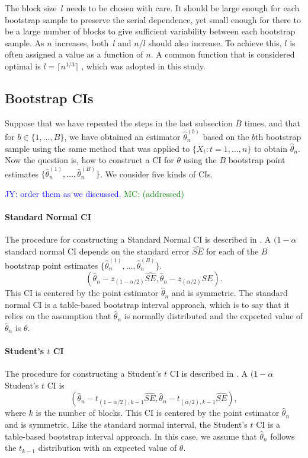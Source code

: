 \documentclass[12pt, letterpaper, titlepage]{article}
\newcommand{\jy}[1]{\textcolor{blue}{JY: #1}}
\newcommand{\mc}[1]{\textcolor{green}{MC: (#1)}}
\begin{document}
The block size~$l$ needs to be chosen with care. It should be large enough for
each bootstrap sample to preserve the serial dependence, yet small enough for
there to be a large number of blocks to give sufficient variability between
each bootstrap sample. As $n$ increases, both~$l$
and $n / l$ should also increase. To achieve this, $l$ is
often assigned a value as a function of $n$. A common function that is
considered optimal is $l = \lceil n^{1/3} \rceil$
\citep{buhlmann1999block}, which was adopted in this
study.

\subsection{Bootstrap CIs}

Suppose that we have repeated the steps in the last subsection $B$ times, and
that for $b \in \{1, \ldots, B\}$, we have obtained an estimator
$\hat\theta_n^{(b)}$ based on the $b$th bootstrap sample using the same method
that was applied to $\{X_t: t = 1, \ldots, n\}$ to obtain $\hat\theta_n$.
Now the question is, how to construct a CI for $\theta$
using the $B$ bootstrap point estimates
$\{\hat\theta_n^{(1)}, \ldots, \hat\theta_n^{(B)}\}$.
We consider five kinds of CIs.

\jy{order them as we discussed.}
\mc{addressed}
\paragraph{Standard Normal CI}
The procedure for constructing a Standard Normal CI is described in 
\citet{efron1993introduction}.
A $(1 - \alpha$ standard normal CI depends on the standard error $\hat{SE}$
for each of the
$B$ bootstrap point estimates
$\{\hat\theta_n^{(1)}, \ldots, \hat\theta_n^{(B)}\}$. 
\[
(\hat{\theta}_{n} - z_{(1-\alpha/2)}\hat{SE}, \hat{\theta}_{n} -
z_{(\alpha/2)}\hat{SE}).
\]
This CI is centered by the point estimator $\hat\theta_n$ and is symmetric.
The standard
normal CI is a table-based bootstrap interval approach, which is to say that
it relies on the 
assumption that $\hat\theta_n$ is normally distributed and the expected value
of $\hat\theta_n$
is $\theta$.

\paragraph{Student's $t$ CI}
The procedure for constructing a Student's $t$ CI is described in 
\citet{efron1993introduction}.
A $(1 - \alpha$ Student's $t$ CI is
\[
(\hat{\theta}_{n} - t_{(1-\alpha/2), k - 1}\hat{SE}, \hat{\theta}_{n} -
t_{(\alpha/2), k -1}\hat{SE}),
\]
where $k$ is the number of blocks.
This CI is centered by the point estimator $\hat\theta_n$ and is symmetric.
Like the standard 
normal interval, the Student's $t$ CI is a table-based bootstrap interval
approach. In this case,
we assume that $\hat\theta_n$ follows the $t_{k-1}$ distribution with an
expected value of $\theta$.
\end{document}
